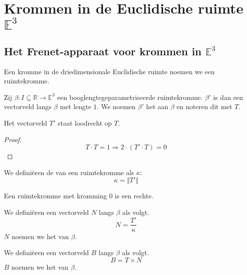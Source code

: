 \documentclass[main.tex]{subfiles}
\begin{document}
\chapter{Krommen in de Euclidische ruimte$\mathbb{E}^{3}$}
\label{cha:kromm-het-eucl}

\section{Het Frenet-apparaat voor krommen in $\mathbb{E}^{3}$}
\label{sec:het-frenet-apparaat-voor-krommen-in-e3}


\begin{de}
  Een kromme in de driedimensionale Euclidische ruimte noemen we een ruimtekromme.
\end{de}

\begin{de}
  Zij $\beta: I \subseteq \mathbb{R} \rightarrow \mathbb{E}^{3}$ een booglengtegeparametriseerde ruimtekromme.
  $\beta'$ is dan een vectorveld langs $\beta$ met lengte $1$.
  We noemen $\beta'$ het  aan $\beta$ en noteren dit met $T$.
\end{de}

\begin{st}
  Het vectorveld $T'$ staat loodrecht op $T$.

  \begin{proof}
    \[ T\cdot T = 1 \Rightarrow 2\cdot(T'\cdot T) = 0 \]
  \end{proof}
\end{st}

\begin{de}
  We defini\"eren de  van een ruimtekromme als $\kappa$:
  \[ \kappa = \Vert T' \Vert \]
\end{de}

\begin{st}
  Een ruimtekromme met kromming $0$ is een rechte.
\end{st}

\begin{de}
  We defini\"eren een vectorveld $N$ langs $\beta$ als volgt.
  \[ N = \frac{T'}{\kappa} \]
  $N$ noemen we het  van $\beta$.
\end{de}

\begin{de}
  We defini\"eren een vectorveld $B$ langs $\beta$ als volgt.
  \[ B = T \times N \]
  $B$ noemen we het  van $\beta$.
\end{de}
\end{document}
